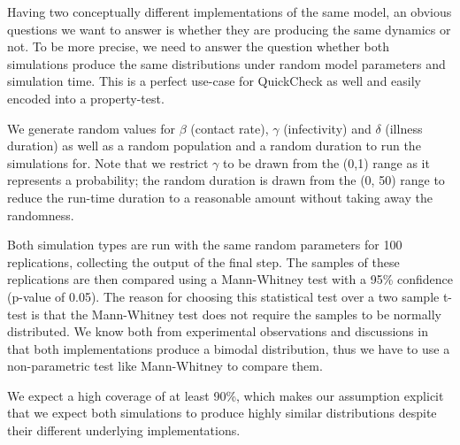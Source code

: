 Having two conceptually different implementations of the same model, an obvious questions we want to answer is whether they are producing the same dynamics or not. To be more precise, we need to answer the question whether both simulations produce the same distributions under random model parameters and simulation time. This is a perfect use-case for QuickCheck as well and easily encoded into a property-test.

We generate random values for $\beta$ (contact rate), $\gamma$ (infectivity) and $\delta$ (illness duration) as well as a random population and a random duration to run the simulations for. Note that we restrict $\gamma$ to be drawn from the (0,1) range as it represents a probability; the random duration is drawn from the (0, 50) range to reduce the run-time duration to a reasonable amount without taking away the randomness.

Both simulation types are run with the same random parameters for 100 replications, collecting the output of the final step. The samples of these replications are then compared using a Mann-Whitney test with a 95\% confidence (p-value of 0.05). The reason for choosing this statistical test over a two sample t-test is that the Mann-Whitney test does not require the samples to be normally distributed. We know both from experimental observations and discussions in \cite{macal_agent-based_2010} that both implementations produce a bimodal distribution, thus we have to use a non-parametric test like Mann-Whitney to compare them.


We expect a high coverage of at least 90\%, which makes our assumption explicit that we expect both simulations to produce highly similar distributions despite their different underlying implementations.

